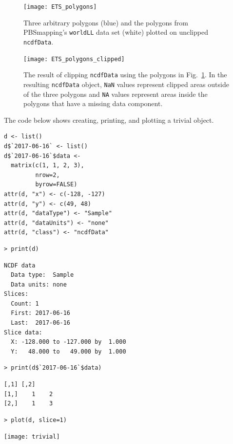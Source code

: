\documentclass[11pt]{report}
\begin{document}
\begin{figure}
  \centering
  \texttt{[image: ETS\_polygons]}
  \caption{
    Three arbitrary polygons (blue) and the polygons from PBSmapping's \texttt{worldLL} data set (white) plotted on unclipped \texttt{ncdfData}.
  }
  \label{fig:ETS_polys}
\end{figure}

\begin{figure}
  \centering
  \texttt{[image: ETS\_polygons\_clipped]}
  \caption{
    The result of clipping \texttt{ncdfData} using the polygons in Fig.~\ref{fig:ETS_polys}.
    In the resulting \texttt{ncdfData} object, \texttt{NaN} values represent clipped areas outside of the three polygons and \texttt{NA} values represent areas inside the polygons that have a missing data component.
  }
  \label{fig:ETS_clipped}
\end{figure}

The code below shows creating, printing, and plotting a trivial  object.

\begin{minipage}[t]{1.0\linewidth}
  \begin{minipage}[t]{0.4\linewidth}
\begin{lstlisting}[basicstyle=\scriptsize\ttfamily,aboveskip=0pt,belowskip=0pt]
d <- list()
d$`2017-06-16` <- list()
d$`2017-06-16`$data <-
  matrix(c(1, 1, 2, 3),
         nrow=2,
         byrow=FALSE)
attr(d, "x") <- c(-128, -127)
attr(d, "y") <- c(49, 48)
attr(d, "dataType") <- "Sample"
attr(d, "dataUnits") <- "none"
attr(d, "class") <- "ncdfData"
\end{lstlisting}
  \end{minipage}%
  \begin{minipage}[t]{0.4\linewidth}
\begin{lstlisting}[basicstyle=\scriptsize\ttfamily,aboveskip=0pt,belowskip=0pt]
> print(d)
\end{lstlisting}
\begin{Verbatim}[fontsize=\scriptsize]
NCDF data
  Data type:  Sample
  Data units: none
Slices:
  Count: 1
  First: 2017-06-16
  Last:  2017-06-16
Slice data:
  X: -128.000 to -127.000 by  1.000
  Y:   48.000 to   49.000 by  1.000
\end{Verbatim}
\begin{lstlisting}[basicstyle=\scriptsize\ttfamily,aboveskip=0pt,belowskip=0pt]
> print(d$`2017-06-16`$data)
\end{lstlisting}
\begin{Verbatim}[fontsize=\scriptsize]
     [,1] [,2]
[1,]    1    2
[2,]    1    3
\end{Verbatim}
  \end{minipage}%
  \begin{minipage}[t]{0.2\linewidth}
\begin{lstlisting}[basicstyle=\scriptsize\ttfamily,aboveskip=0pt,belowskip=0pt]
> plot(d, slice=1)
\end{lstlisting}
\texttt{[image: trivial]}
  \end{minipage}
\end{minipage}
\end{document}
